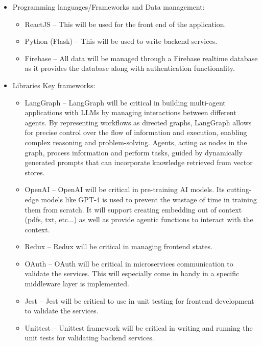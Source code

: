 \documentclass{article}
\begin{document}
\begin{itemize}
  \item Programming languages/Frameworks and Data management:
    \begin{itemize}
      \item ReactJS -- This will be used for the front end of the application.
      \item Python (Flask) -- This will be used to write backend services.
      \item Firebase -- All data will be managed through a Firebase realtime database as it provides the database along with authentication functionality.
    \end{itemize}
    

  \item Libraries
    Key frameworks:
    \begin{itemize}
      \item LangGraph -- LangGraph will be critical in building multi-agent applications with LLMs by managing interactions between different agents. By representing workflows as directed graphs, LangGraph allows for precise control over the flow of information and execution, enabling complex reasoning and problem-solving. Agents, acting as nodes in the graph, process information and perform tasks, guided by dynamically generated prompts that can incorporate knowledge retrieved from vector stores. 
      \item OpenAI -- OpenAI will be critical in pre-training AI models. Its cutting-edge models like GPT-4 is used to prevent the wastage of time in training them from scratch. It will support creating embedding out of context (pdfs, txt, etc...) as well as provide agentic functions to interact with the context.
      \item Redux -- Redux will be critical in managing frontend states.
      \item OAuth -- OAuth will be critical in microservices communication to validate the services. This will especially come in handy in a specific middleware layer is implemented.
      \item Jest -- Jest will be critical to use in unit testing for frontend development to validate the services. 
      \item Unittest -- Unittest framework will be critical in writing and running the unit tests for validating backend services.    
    \end{itemize}


\end{itemize}
\end{document}
